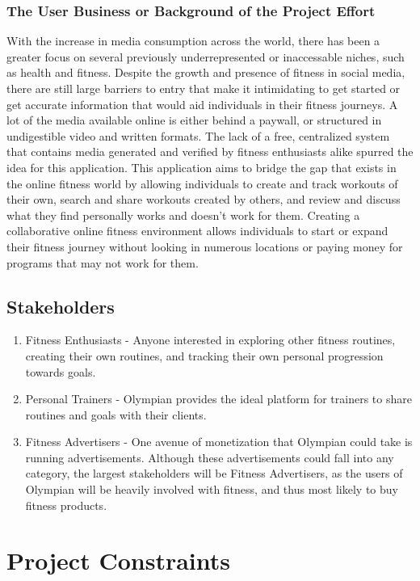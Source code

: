 \documentclass[12pt]{article}
\begin{document}
  \subsubsection{The User Business or Background of the Project Effort}
  \noindent
  With the increase in media consumption across the world, there has been a greater focus on several previously underrepresented or inaccessable niches, such as health and fitness. Despite the growth and presence of fitness in social media, there are still large barriers to entry that make it intimidating to get started or get accurate information that would aid individuals in their fitness journeys. A lot of the media available online is either behind a paywall, or structured in undigestible video and written formats. The lack of a free, centralized system that contains media generated and verified by fitness enthusiasts alike spurred the idea for this application. This application aims to bridge the gap that exists in the online fitness world by allowing individuals to create and track workouts of their own, search and share workouts created by others, and review and discuss what they find personally works and doesn't work for them. Creating a collaborative online fitness environment allows individuals to start or expand their fitness journey without looking in numerous locations or paying money for programs that may not work for them. 
\subsection{Stakeholders}
\begin{enumerate}
	\item Fitness Enthusiasts - Anyone interested in exploring other fitness routines, creating their own routines, and tracking their own personal progression towards goals.
	\item Personal Trainers - Olympian provides the ideal platform for trainers to share routines and goals with their clients.
	\item Fitness Advertisers - One avenue of monetization that Olympian could take is running advertisements. Although these advertisements could fall into any category, the largest stakeholders will be Fitness Advertisers,
	as the users of Olympian will be heavily involved with fitness, and thus most likely to buy fitness products.
\end{enumerate} 

\section{Project Constraints}
\end{document}
